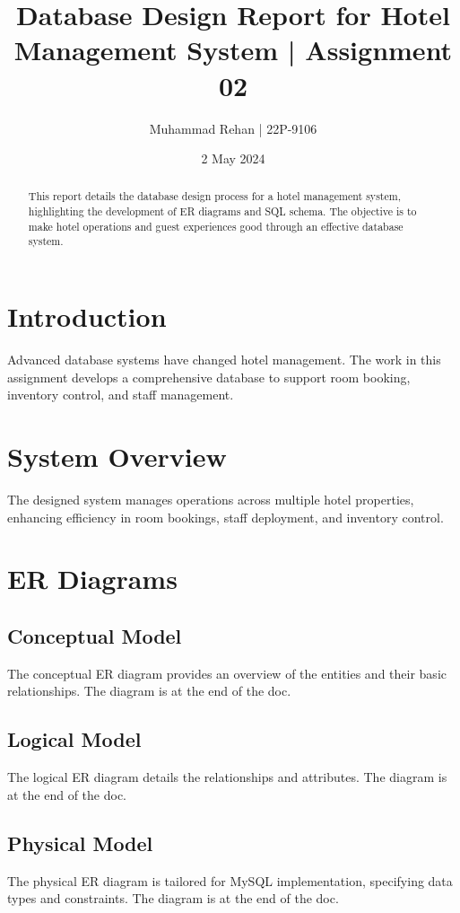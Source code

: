 \documentclass{article}
\title{Database Design Report for Hotel Management System | Assignment 02}
\author{Muhammad Rehan | 22P-9106}
\date{2 May 2024}
\begin{document}
\maketitle

\begin{abstract}
This report details the database design process for a hotel management system, highlighting the development of ER diagrams and SQL schema. The objective is to make hotel operations and guest experiences good through an effective database system.
\end{abstract}

\section*{Introduction}
Advanced database systems have changed hotel management. The work in this assignment develops a comprehensive database to support room booking, inventory control, and staff management.

\section*{System Overview}
The designed system manages operations across multiple hotel properties, enhancing efficiency in room bookings, staff deployment, and inventory control.

\section*{ER Diagrams}
\subsection*{Conceptual Model}
The conceptual ER diagram provides an overview of the entities and their basic relationships. The diagram is at the end of the doc.


\subsection*{Logical Model}
The logical ER diagram details the relationships and attributes. The diagram is at the end of the doc.


\subsection*{Physical Model}
The physical ER diagram is tailored for MySQL implementation, specifying data types and constraints. The diagram is at the end of the doc.
\end{document}
